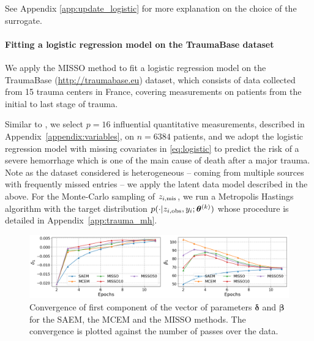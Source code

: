 \documentclass[11pt]{article}
\theoremstyle{t}
\begin{document}
See Appendix \ref{app:update_logistic} for more explanation on the choice of the surrogate.

\paragraph{Fitting a logistic regression model on the TraumaBase dataset}
We apply the MISSO method to fit a logistic regression model on the TraumaBase (\url{http://traumabase.eu}) dataset, which consists of data collected from 15 trauma centers in France, covering measurements on patients from the initial to last stage of trauma.

Similar to \citep{jiang2018logistic}, we select $p = 16$ influential quantitative measurements, described in Appendix~\ref{appendix:variables}, on $n = 6384$ patients, and we adopt
the logistic regression model with missing covariates in \eqref{eq:logistic} to predict the risk of a severe hemorrhage which is one of the main cause of death after a major trauma.
Note as the dataset considered is heterogeneous -- coming from multiple sources with frequently missed entries -- we apply the latent data model described in the above.
For the Monte-Carlo sampling of $z_{i,\mis}$, we run a Metropolis Hastings algorithm with the target distribution $p( \cdot |z_{i,\obs}, y_i; \hp{k})$ whose procedure is detailed in Appendix~\ref{app:trauma_mh}.

\begin{figure}[H]
\includegraphics[width=\textwidth]{pic_paper/traumabasenoexp.png}\vspace{-.2cm}
\caption{Convergence of first component of the vector of parameters ${\bm \delta}$ and ${\bm \beta}$ for the SAEM, the MCEM and the MISSO methods. The convergence is plotted against the number of passes over the data.}\vspace{-.2cm}
\label{fig:misso_trauma}
\end{figure}
\end{document}
